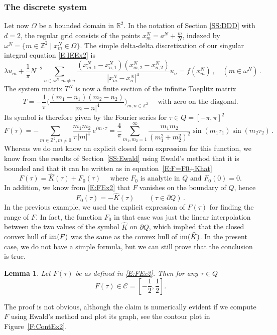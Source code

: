 \documentclass[12pt]{amsart}
\newtheorem{lemma}[theorem]{Lemma}
\theoremstyle{definition}
\theoremstyle{remark}
\numberwithin{equation}{section}
\newcommand{\im}{\operatorname{\rm im}}
\newcommand\R{{\mathbb R}}
\newcommand\Z{{\mathbb Z}}
\newcommand\cC{{\mathcal{C}}}
\let\hat=\widehat
\begin{document}
\subsubsection{The discrete system}\label{SS:DA2dEx2}
Let  now $\Omega$ be a bounded domain in $\R^{2}$.
In the notation of Section \ref{SS:DDD} with $d=2$, the regular grid consists of the points $x^{N}_{m}=a^{N}+\frac{m}N$, indexed by $\omega^{N} = \{m\in\Z^{2} \mid x^{N}_{m}\in \Omega\}$. The simple delta-delta discretization of our singular integral equation \eqref{E:IEEx2} is
\begin{equation}
\label{E:DDA2dEx2}
 \lambda u_{m} + \frac{1}{\pi} N^{-2}
 \sum_{n\in\omega^{N},m\ne n} 
 \frac{(x^{N}_{m,1}-x^{N}_{n,1})(x^{N}_{m,2}-x^{N}_{n,2})}{|x^{N}_{m}-x^{N}_{n}|^{4}}
  u_{n}
 = f(x^{N}_{m}) \,,\quad (m\in\omega^{N})\,.
\end{equation}
The system matrix $T^{N}$  is now a finite section of the infinite Toeplitz matrix
$$
  T = -\frac1\pi \Big(  
  \frac{(m_{1}-n_{1})(m_{2}-n_{2})}{|m-n|^{4}}
  \Big)_{m,n\in\Z^{2}}\quad
  \mbox{ with zero on the diagonal.}
$$
Its symbol is therefore given by the Fourier series for $\tau\in Q=[-\pi,\pi]^{2}$
\begin{equation}
\label{E:FEx2}
 F(\tau) = -\sum_{m\in\Z^{2},m\ne0}\frac{m_{1}m_{2}}{\pi|m|^{4}}\,e^{im\cdot \tau}
  = \frac4\pi \sum_{m_{1},m_{2}=1}^{\infty}
    \frac{m_{1}m_{2}}{(m_{1}^{2}+m_{2}^{2})^{2}}
    \sin(m_{1}\tau_{1}) \sin(m_{2}\tau_{2})
        \,.
\end{equation}
Whereas we do not know an explicit closed form expression for this function, we know from the results of Section~\ref{SS:Ewald} using Ewald's method that it is bounded and that it can be written as in equation~\eqref{E:F=F0+Khat}
\begin{equation}
\label{E:F=F0+KhatEx2} 
 F(\tau) = \hat K(\tau) + F_{0}(\tau) \quad
  \mbox{ where $F_{0}$ is analytic in $Q$ and $F_{0}(0)=0$}.  
\end{equation}
In addition, we know from \eqref{E:FEx2} that $F$ vanishes on the boundary of $Q$, hence
\begin{equation}
\label{E:F0boundary}
 F_{0}(\tau) = -\hat K(\tau) \qquad (\tau\in\partial Q)\,.
\end{equation}
In the previous example, we used the explicit expression of $F(\tau)$ for finding the range of $F$. In fact, the function $F_{0}$ in that case was just the linear interpolation between the two values of the symbol $\hat K$ on $\partial Q$, which implied that the closed convex hull of $\im(F)$ was the same as the convex hull of $\im(\hat K)$. In the present case, we do not have a simple formula, but we can still prove that the conclusion is true.
\begin{lemma}
 \label{L:im(Fex2)}
 Let $F(\tau)$ be as defined in \eqref{E:FEx2}. Then for any $\tau\in Q$
\begin{equation}
\label{E:Fpos}
  F(\tau) \in \cC=[-\frac12,\frac12].
\end{equation}
\end{lemma}
The proof is not obvious, although the claim is numerically evident if we compute $F$ using Ewald's method and plot its graph, see the contour plot in Figure~\ref{F:ContEx2}.
\end{document}
